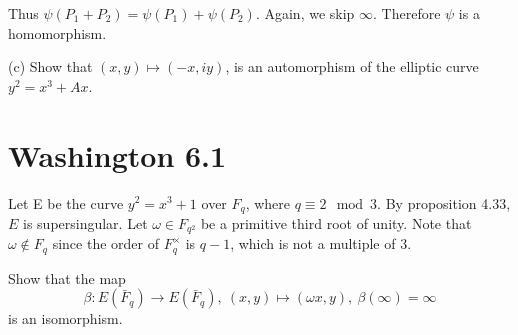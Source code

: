 \documentclass{article}
\begin{document}
Thus $\psi(P_1 + P_2) = \psi(P_1) + \psi(P_2)$. Again, we skip $\infty$. Therefore $\psi$ is a homomorphism.

(c) Show that $(x, y) \mapsto (−x, iy)$, is an automorphism of the elliptic curve $y^2 = x^3 + Ax$.

\section{Washington 6.1}
Let E be the curve $y^2 = x^3+1$ over $F_q$, where $q \equiv 2 \mod 3$. By proposition 4.33, $E$ is supersingular. Let $\omega \in F_{q^2}$ be a primitive third root of unity. Note that $\omega \not \in F_q$ since the order of $F_q^\times$ is $q-1$, which is not a multiple of $3$.

Show that the map
$$\beta: E(\bar F_q) \to E(\bar F_q), ~ (x,y) \mapsto (\omega x, y), ~ \beta(\infty) = \infty$$
is an isomorphism.
\end{document}

